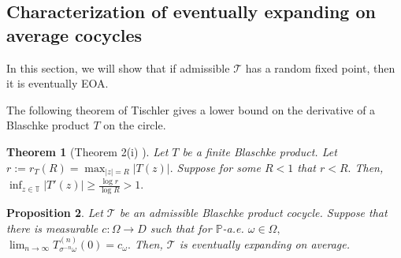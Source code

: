 \documentclass[12pt,reqno]{amsart}
\newtheorem{theorem}{Theorem}
\numberwithin{theorem}{section}
\newtheorem{proposition}[theorem]{Proposition}%
\begin{document}
\subsection{Characterization of eventually expanding on average cocycles}\label{section_EEOA}

In this section, we will show that if admissible $\mathcal{T}$ has a random fixed point, then it is eventually EOA.

The following theorem of Tischler gives a lower bound on the derivative of a Blaschke product $T$ on the circle.
\begin{theorem}[Theorem 2(i) \cite{tischler}]\label{tischler}
    Let $T$ be a finite Blaschke product. Let $r:=r_{T}(R)=\max_{|z|=R}|T(z)|.$ Suppose for some $R<1$ that $r<R.$ Then,  $\inf_{z\in\mathbb{T}}|T'(z)|\ge\frac{\log r}{\log R}>1.$
\end{theorem}

\begin{proposition}\label{rfp_oi_eoa}
    Let $\mathcal{T}$ be an admissible Blaschke product cocycle. Suppose that there is measurable $c:\Omega\to D$ such that for $\mathbb{P}$-a.e. $\omega\in\Omega,$ $\lim_{n\to\infty}T_{\sigma^{-n}\omega}^{(n)}(0)=c_{\omega}.$
    Then, $\mathcal{T}$ is eventually expanding on average. 
\end{proposition}
\end{document}
